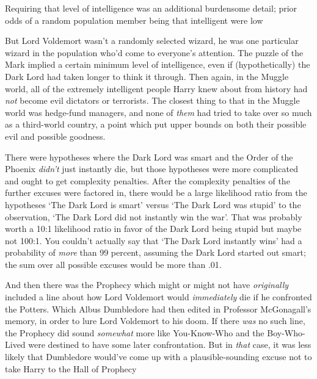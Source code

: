 Requiring that level of intelligence was an additional burdensome detail; prior
odds of a random population member being that intelligent were low{\el}

But Lord Voldemort wasn't a randomly selected wizard, he was one particular
wizard in the population who'd come to everyone's attention. The puzzle of the
Mark implied a certain minimum level of intelligence, even if (hypothetically)
the Dark Lord had taken longer to think it through. Then again, in the Muggle
world, all of the extremely intelligent people Harry knew about from history
had \emph{not} become evil dictators or terrorists. The closest thing to that
in the Muggle world was hedge-fund managers, and none of \emph{them} had tried
to take over so much as a third-world country, a point which put upper bounds
on both their possible evil and possible goodness.

There were hypotheses where the Dark Lord was smart and the Order of the
Phoenix \emph{didn't} just instantly die, but those hypotheses were more
complicated and ought to get complexity penalties. After the complexity
penalties of the further excuses were factored in, there would be a large
likelihood ratio from the hypotheses `The Dark Lord is smart' versus `The Dark
Lord was stupid' to the observation, `The Dark Lord did not instantly win the
war'. That was probably worth a 10:1 likelihood ratio in favor of the Dark Lord
being stupid{\el} but maybe not 100:1. You couldn't actually say that `The
Dark Lord instantly wins' had a probability of \emph{more} than 99 percent,
assuming the Dark Lord started out smart; the sum over all possible excuses
would be more than .01.

And then there was the Prophecy{\el} which might or might not have
\emph{originally} included a line about how Lord Voldemort would
\emph{immediately} die if he confronted the Potters. Which Albus Dumbledore had
then edited in Professor McGonagall's memory, in order to lure Lord Voldemort
to his doom. If there \emph{was} no such line, the Prophecy did sound
\emph{somewhat} more like You-Know-Who and the Boy-Who-Lived were destined to
have some later confrontation. But in \emph{that} case, it was less likely that
Dumbledore would've come up with a plausible-sounding excuse not to take Harry
to the Hall of Prophecy{\el}

